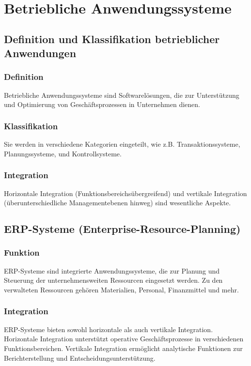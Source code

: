 \section{Betriebliche Anwendungssysteme}

\subsection{Definition und Klassifikation betrieblicher Anwendungen}
    \subsubsection*{Definition}
        Betriebliche Anwendungssysteme sind Softwarelösungen, die zur Unterstützung und Optimierung von Geschäftsprozessen in Unternehmen dienen.
    \subsubsection*{Klassifikation}
        Sie werden in verschiedene Kategorien eingeteilt, wie z.B. Transaktionssysteme, Planungssysteme, und Kontrollsysteme.
    \subsubsection*{Integration}
        Horizontale Integration (Funktionsbereichsübergreifend) und vertikale Integration (überunterschiedliche Managementebenen hinweg) sind wesentliche Aspekte.

\subsection{ERP-Systeme (Enterprise-Resource-Planning)}
    \subsubsection*{Funktion}
        ERP-Systeme sind integrierte Anwendungssysteme, die zur Planung und Steuerung der unternehmensweiten Ressourcen eingesetzt werden. Zu den verwalteten Ressourcen gehören Materialien, Personal, Finanzmittel und mehr.
    \subsubsection*{Integration}
        ERP-Systeme bieten sowohl horizontale als auch vertikale Integration. Horizontale Integration unterstützt operative Geschäftsprozesse in verschiedenen Funktionsbereichen. Vertikale Integration ermöglicht analytische Funktionen zur Berichterstellung und Entscheidungsunterstützung.
